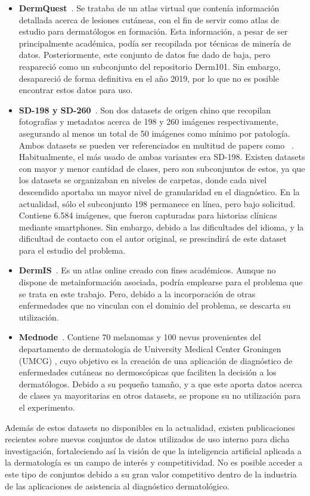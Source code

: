 \begin{itemize}
	\item \textbf{DermQuest}~\cite{dermquest}. Se trataba de un atlas virtual que contenía información detallada acerca de lesiones cutáneas, con el fin de servir como atlas de estudio para dermatólogos en formación. Esta información, a pesar de ser principalmente académica, podía ser recopilada por técnicas de minería de datos.  Posteriormente, este conjunto de datos fue dado de baja, pero reapareció como un subconjunto del repositorio Derm101. Sin embargo, desapareció de forma definitiva en el año 2019, por lo que no es posible encontrar estos datos para uso.
	
	\item \textbf{SD-198 y SD-260}~\cite{10.1007/978-3-319-46466-4_13}. Son dos datasets de origen chino que recopilan fotografías y metadatos acerca de 198 y 260 imágenes respectivamente, asegurando al menos un total de 50 imágenes como mínimo por patología. Ambos datasets se pueden ver referenciados en multitud de papers como ~\cite{goyal2020artificial}. Habitualmente, el más usado de ambas variantes era SD-198. Existen datasets con mayor y menor cantidad de clases, pero son subconjuntos de estos, ya que los datasets se organizaban en niveles de carpetas, donde cada nivel descendido aportaba un mayor nivel de granularidad en el diagnóstico. En la actualidad, sólo el subconjunto 198 permanece en línea, pero bajo solicitud. Contiene 6.584 imágenes, que fueron capturadas para historias clínicas mediante smartphones. Sin embargo, debido a las dificultades del idioma, y la dificultad de contacto con el autor original, se prescindirá de este dataset para el estudio del problema.
	\item \textbf{DermIS}~\cite {dermis}. Es un atlas online creado con fines académicos. Aunque no dispone de metainformación asociada, podría emplearse para el  problema que se trata en este trabajo. Pero, debido a la incorporación de otras enfermedades que no vinculan con el dominio del problema, se descarta su utilización.
	\item \textbf{Mednode}~\cite{GIOTIS20156578}. Contiene 70 melanomas y 100 nevus provenientes del  departamento de dermatologia de University Medical Center Groningen (UMCG) , cuyo objetivo es la creación de una aplicación de diagnóstico de enfermedades cutáneas no dermoscópicas que faciliten la decisión a los dermatólogos. Debido a su pequeño tamaño, y a que este aporta datos acerca de clases ya mayoritarias en otros datasets, se propone su no utilización para el experimento.
\end{itemize}

Además de estos datasets no disponibles en la actualidad, existen publicaciones recientes sobre nuevos conjuntos de datos utilizados de uso interno para dicha investigación, fortaleciendo así la visión de que la inteligencia artificial aplicada a la dermatología es un campo de interés y competitividad. No es posible acceder a este tipo de conjuntos debido a su gran valor competitivo dentro de la industria  de las aplicaciones de asistencia al diagnóstico dermatológico.